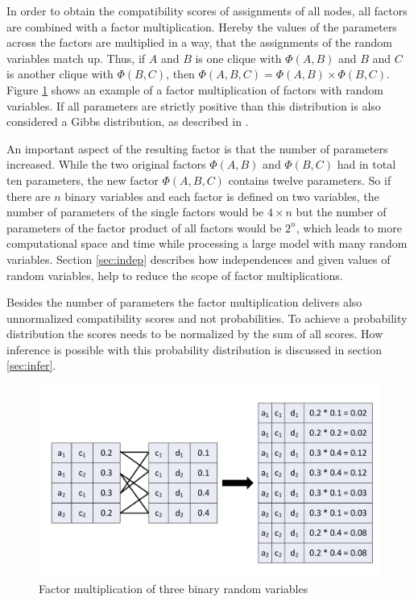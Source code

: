 In order to obtain the compatibility scores of assignments of all nodes, all factors are combined with a factor multiplication. Hereby the values of the parameters across the factors are multiplied in a way, that the assignments of the random variables match up. Thus, if $A$ and $B$ is one clique with $\Phi(A,B)$ and $B$ and $C$ is another clique with $\Phi(B,C)$, then $\Phi(A,B,C)=\Phi(A,B)\times\Phi(B,C)$. Figure \ref{fig:parammult} shows an example of a factor multiplication of factors with random variables. If all parameters are strictly positive than this distribution is also considered a Gibbs distribution, as described in \cite{kindermann1980markov}.

An important aspect of the resulting factor is that the number of parameters increased. While the two original factors $\Phi(A,B)$ and $\Phi(B,C)$ had in total ten parameters, the new factor $\Phi(A,B,C)$ contains twelve parameters. So if there are $n$ binary variables and each factor is defined on two variables, the number of parameters of the single factors would be $4\times n$ but the number of parameters of the factor product of all factors would be $2^n$, which leads to more computational space and time while processing a large model with many random variables. Section \ref{sec:indep} describes how independences and given values of random variables, help to reduce the scope of factor multiplications.

Besides the number of parameters the factor multiplication delivers also unnormalized compatibility scores and not probabilities. To achieve a probability distribution the scores needs to be normalized by the sum of all scores. How inference is possible with this probability distribution is discussed in section \ref{sec:infer}.


\begin{figure}[htpb]
  \centering
  	\includegraphics[scale=0.4]{img/parammult.pdf} 
  \caption{Factor multiplication of three binary random variables}
  \label{fig:parammult}
\end{figure}

